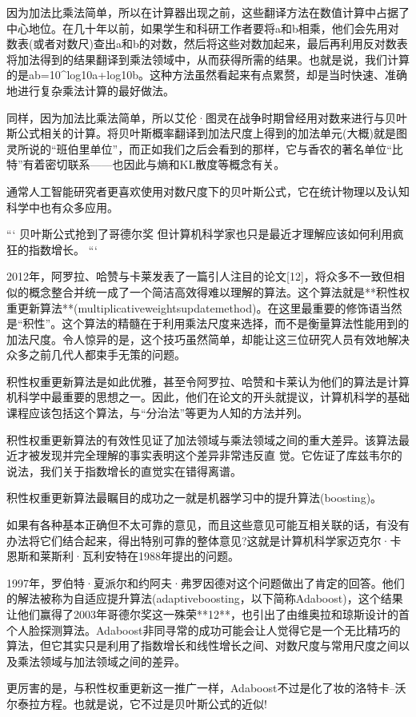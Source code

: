 因为加法比乘法简单，所以在计算器出现之前，这些翻译方法在数值计算中占据了中心地位。在几十年以前，如果学生和科研工作者要将a和b相乘，他们会先用对数表(或者对数尺)查出a和b的对数，然后将这些对数加起来，最后再利用反对数表将加法得到的结果翻译到乘法领域中，从而获得所需的结果。也就是说，我们计算的是ab=10^{log10a+log10b}。这种方法虽然看起来有点累赘，却是当时快速、准确地进行复杂乘法计算的最好做法。

同样，因为加法比乘法简单，所以艾伦·图灵在战争时期曾经用对数来进行与贝叶斯公式相关的计算。将贝叶斯概率翻译到加法尺度上得到的加法单元(大概)就是图灵所说的“班伯里单位”，而正如我们之后会看到的那样，它与香农的著名单位“比特”有着密切联系——也因此与熵和KL散度等概念有关。

通常人工智能研究者更喜欢使用对数尺度下的贝叶斯公式，它在统计物理以及认知科学中也有众多应用。

```
贝叶斯公式抢到了哥德尔奖
但计算机科学家也只是最近才理解应该如何利用疯狂的指数增长。
```

2012年，阿罗拉、哈赞与卡莱发表了一篇引人注目的论文[12]，将众多不一致但相似的概念整合并统一成了一个简洁高效得难以理解的算法。这个算法就是**积性权重更新算法**(multiplicativeweightsupdatemethod)。在这里最重要的修饰语当然是“积性”。这个算法的精髓在于利用乘法尺度来选择，而不是衡量算法性能用到的加法尺度。令人惊异的是，这个技巧虽然简单，却能让这三位研究人员有效地解决众多之前几代人都束手无策的问题。

积性权重更新算法是如此优雅，甚至令阿罗拉、哈赞和卡莱认为他们的算法是计算机科学中最重要的思想之一。因此，他们在论文的开头就提议，计算机科学的基础课程应该包括这个算法，与“分治法”等更为人知的方法并列。



积性权重更新算法的有效性见证了加法领域与乘法领域之间的重大差异。该算法最近才被发现并完全理解的事实表明这个差异非常违反直
觉。它佐证了库兹韦尔的说法，我们关于指数增长的直觉实在错得离谱。

积性权重更新算法最瞩目的成功之一就是机器学习中的提升算法(boosting)。

如果有各种基本正确但不太可靠的意见，而且这些意见可能互相关联的话，有没有办法将它们结合起来，得出特别可靠的整体意见?这就是计算机科学家迈克尔·卡恩斯和莱斯利·瓦利安特在1988年提出的问题。

1997年，罗伯特·夏派尔和约阿夫·弗罗因德对这个问题做出了肯定的回答。他们的解法被称为自适应提升算法(adaptiveboosting，以下简称Adaboost)，这个结果让他们赢得了2003年哥德尔奖这一殊荣**12**，也引出了由维奥拉和琼斯设计的首个人脸探测算法。Adaboost非同寻常的成功可能会让人觉得它是一个无比精巧的算法，但它其实只是利用了指数增长和线性增长之间、对数尺度与常用尺度之间以及乘法领域与加法领域之间的差异。

更厉害的是，与积性权重更新这一推广一样，Adaboost不过是化了妆的洛特卡–沃尔泰拉方程。也就是说，它不过是贝叶斯公式的近似!





